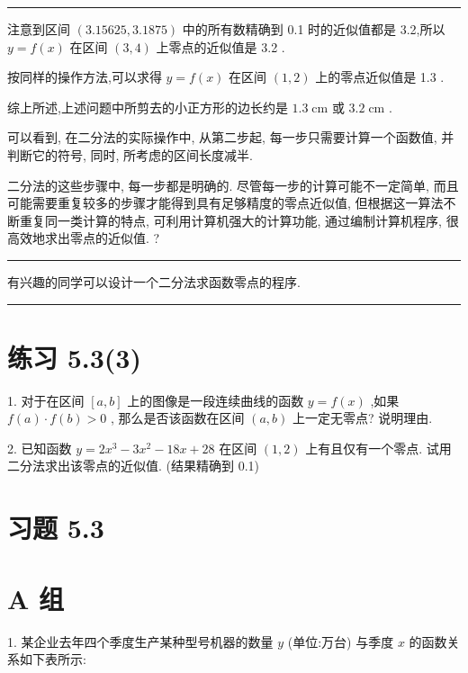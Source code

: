 \documentclass[10pt]{article}
\newcommand{\HRule}{\begin{center}\rule{0.9\linewidth}{0.2mm}\end{center}}
\begin{document}
\HRule



注意到区间 \(\left( {{3.15625},{3.1875}}\right)\) 中的所有数精确到 0.1 时的近似值都是 3.2,所以 \(y = f\left( x\right)\) 在区间 \(\left( {3,4}\right)\) 上零点的近似值是 3.2 .

按同样的操作方法,可以求得 \(y = f\left( x\right)\) 在区间 \(\left( {1,2}\right)\) 上的零点近似值是 1.3 .

综上所述,上述问题中所剪去的小正方形的边长约是 \({1.3}\mathrm{\;{cm}}\) 或 \({3.2}\mathrm{\;{cm}}\) .

可以看到, 在二分法的实际操作中, 从第二步起, 每一步只需要计算一个函数值, 并判断它的符号, 同时, 所考虑的区间长度减半.

二分法的这些步骤中, 每一步都是明确的. 尽管每一步的计算可能不一定简单, 而且可能需要重复较多的步骤才能得到具有足够精度的零点近似值, 但根据这一算法不断重复同一类计算的特点, 可利用计算机强大的计算功能, 通过编制计算机程序, 很高效地求出零点的近似值. ?

\HRule

有兴趣的同学可以设计一个二分法求函数零点的程序.

\HRule

\section*{练习 5.3(3)}

1. 对于在区间 \(\left\lbrack  {a,b}\right\rbrack\) 上的图像是一段连续曲线的函数 \(y = f\left( x\right)\) ,如果 \(f\left( a\right)  \cdot  f\left( b\right)  > 0\) , 那么是否该函数在区间 \(\left( {a,b}\right)\) 上一定无零点? 说明理由.

2. 已知函数 \(y = 2{x}^{3} - 3{x}^{2} - {18x} + {28}\) 在区间 \(\left( {1,2}\right)\) 上有且仅有一个零点. 试用二分法求出该零点的近似值. (结果精确到 0.1)

\section*{习题 5.3}

\section*{A 组}

1. 某企业去年四个季度生产某种型号机器的数量 \(y\) (单位:万台) 与季度 \(x\) 的函数关系如下表所示:

\begin{center}
\end{center}
\end{document}
